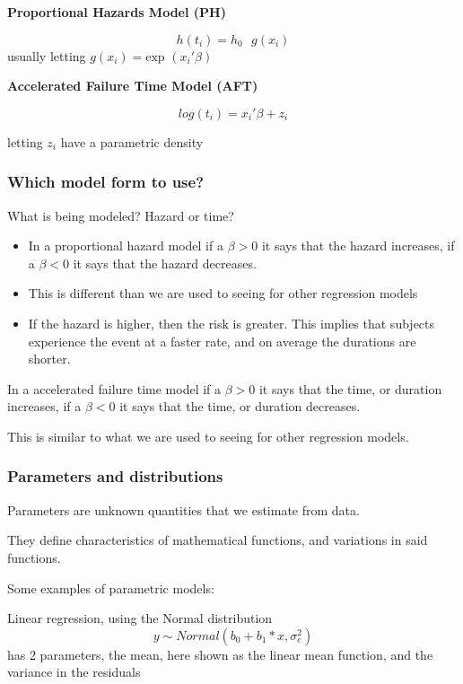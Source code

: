 \documentclass[
]{article}
\begin{document}
\textbf{Proportional Hazards Model (PH)}

\[h(t_i) = h_0 \text{ } g(x_i)\] usually letting
\(g(x_i) = \text{exp } (x_i ' \beta)\)

\textbf{Accelerated Failure Time Model (AFT)}

\[log(t_i) = x_i ' \beta +z_i\]

letting \(z_i\) have a parametric density

\hypertarget{which-model-form-to-use}{%
\subsubsection{Which model form to use?}\label{which-model-form-to-use}}

What is being modeled? Hazard or time?

\begin{itemize}
\item
  In a proportional hazard model if a \(\beta >0\) it says that the
  hazard increases, if a \(\beta <0\) it says that the hazard decreases.
\item
  This is different than we are used to seeing for other regression
  models
\item
  If the hazard is higher, then the risk is greater. This implies that
  subjects experience the event at a faster rate, and on average the
  durations are shorter.
\end{itemize}

In a accelerated failure time model if a \(\beta >0\) it says that the
time, or duration increases, if a \(\beta <0\) it says that the time, or
duration decreases.

This is similar to what we are used to seeing for other regression
models.

\hypertarget{parameters-and-distributions}{%
\subsubsection{Parameters and
distributions}\label{parameters-and-distributions}}

Parameters are unknown quantities that we estimate from data.

They define characteristics of mathematical functions, and variations in
said functions.

Some examples of parametric models:

Linear regression, using the Normal distribution\\
\[y \sim Normal (b_0+b_1*x, \sigma^2_e)\] has 2 parameters, the mean,
here shown as the linear mean function, and the variance in the
residuals
\end{document}
